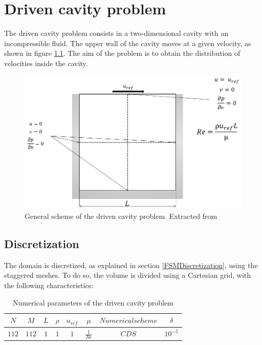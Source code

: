 \chapter{Driven cavity problem}
The driven cavity problem consists in a two-dimensional cavity with an incompressible fluid. The upper wall of the cavity moves at a given velocity, as shown in figure \ref{DrivenCavityImg}. The aim of the problem is to obtain the distribution of velocities inside the cavity.
\begin{figure}[h]
	\centering
	\includegraphics[scale=0.5]{DrivenCavity/DrivenCavity}
	\caption[General scheme of the driven cavity problem]{General scheme of the driven cavity problem. Extracted from \cite{CTTCa}}
	\label{DrivenCavityImg}
\end{figure}

\section{Discretization}
The domain is discretized, as explained in section \ref{FSMDiscretization}, using the staggered meshes. To do so, the volume is divided using a Cartesian grid, with the following characteristics:
\begin{table}[]
	\centering
	\begin{tabular}{ |c|c|c|c|c|c|c|c| }
		\hline
		$N$ & $M$ & $L$ & $\rho$ & $u_{ref}$ & $\mu$ & $Numerical scheme$ & $\delta$ \\ \hline
		$112$ & $112$ & $1$ & $1$ & $1$ & $\frac{1}{Re}$ & $CDS$ & $10^{-5}$ \\ \hline
	\end{tabular}
\caption{Numerical parameters of the driven cavity problem}
\end{table}


